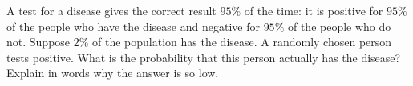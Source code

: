 A test for a disease gives the correct result $95\%$ of the time: it is positive for $95\%$ of the people who have the disease and negative for $95\%$ of the people who do not. Suppose $2\%$ of the population has the disease. A randomly chosen person tests positive. What is the probability that this person actually has the disease? Explain in words why the answer is so low.
